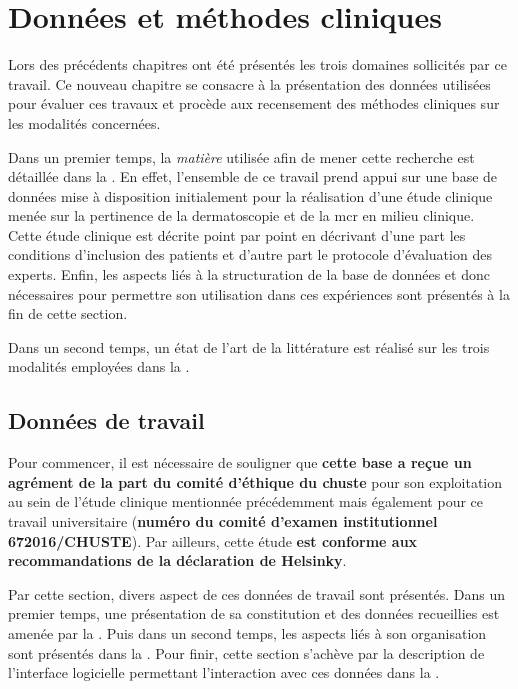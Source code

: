 \renewcommand{\thechapter}{\arabic{chapter}}
\setcounter{chapter}{3}

\chapter{Données et méthodes cliniques}
\label{chap:chapter_4}
\chapterintro
Lors des précédents chapitres ont été présentés les trois domaines sollicités par ce travail. Ce nouveau chapitre se consacre à la présentation des données utilisées pour évaluer ces travaux et procède aux recensement des méthodes cliniques sur les modalités concernées.\par

Dans un premier temps, la \textit{matière} utilisée afin de mener cette recherche est détaillée dans la . En effet, l'ensemble de ce travail prend appui sur une base de données mise à disposition initialement pour la réalisation d'une étude clinique menée sur la pertinence de la dermatoscopie et de la \acrlong{mcr} en milieu clinique. Cette étude clinique est décrite point par point en décrivant d'une part les conditions d'inclusion des patients et d'autre part le protocole d'évaluation des experts. Enfin, les aspects liés à la structuration de la base de données et donc nécessaires pour permettre son utilisation dans ces expériences sont présentés à la fin de cette section.\par

Dans un second temps, un état de l'art de la littérature est réalisé sur les trois modalités employées dans la .\par
\newpage

\section{Données de travail}
\label{sec:clinical_data}
Pour commencer, il est nécessaire de souligner que \textbf{cette base a reçue un agrément de la part du comité d'éthique du \acrfull{chuste}} pour son exploitation au sein de l'étude clinique mentionnée précédemment mais également pour ce travail universitaire (\textbf{numéro du comité d'examen institutionnel 672016/CHUSTE}). Par ailleurs, cette étude \textbf{est conforme aux recommandations de la déclaration de Helsinky}.\par

Par cette section, divers aspect de ces données de travail sont présentés. Dans un premier temps, une présentation de sa constitution et des données recueillies est amenée par la . Puis dans un second temps, les aspects liés à son organisation sont présentés dans la . Pour finir, cette section s'achève par la description de l'interface logicielle permettant l'interaction avec ces données dans la .


